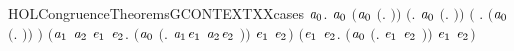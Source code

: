 \begin{SaveVerbatim}{HOLCongruenceTheoremsGCONTEXTXXcases}
\HOLTokenTurnstile{} \HOLSymConst{\HOLTokenForall{}}\ensuremath{\HOLBoundVar{a}\sb{\mathrm{0}}}.
        \ensuremath{\HOLBoundVar{a}\sb{\mathrm{0}}} \HOLSymConst{\HOLTokenEquiv{}}
       \ensuremath{(}\ensuremath{\HOLBoundVar{a}\sb{\mathrm{0}}} \HOLSymConst{\ensuremath{=}} \ensuremath{(}\HOLTokenLambda{}. \ensuremath{)}\ensuremath{)} \HOLSymConst{\HOLTokenDisj{}} \ensuremath{(}\HOLSymConst{\HOLTokenExists{}}. \ensuremath{\HOLBoundVar{a}\sb{\mathrm{0}}} \HOLSymConst{\ensuremath{=}} \ensuremath{(}\HOLTokenLambda{}. \ensuremath{)}\ensuremath{)} \HOLSymConst{\HOLTokenDisj{}}
       \ensuremath{(}\HOLSymConst{\HOLTokenExists{}} . \ensuremath{(}\ensuremath{\HOLBoundVar{a}\sb{\mathrm{0}}} \HOLSymConst{\ensuremath{=}} \ensuremath{(}\HOLTokenLambda{}. \HOLSymConst{\ensuremath{\ldotp}} \ensuremath{)}\ensuremath{)} \HOLSymConst{\HOLTokenConj{}}  \ensuremath{)} \HOLSymConst{\HOLTokenDisj{}}
       \ensuremath{(}\HOLSymConst{\HOLTokenExists{}}\ensuremath{\HOLBoundVar{a}\sb{\mathrm{1}}} \ensuremath{\HOLBoundVar{a}\sb{\mathrm{2}}} \ensuremath{\HOLBoundVar{e}\sb{\mathrm{1}}} \ensuremath{\HOLBoundVar{e}\sb{\mathrm{2}}}.
            \ensuremath{(}\ensuremath{\HOLBoundVar{a}\sb{\mathrm{0}}} \HOLSymConst{\ensuremath{=}} \ensuremath{(}\HOLTokenLambda{}. \ensuremath{\HOLBoundVar{a}\sb{\mathrm{1}}}\HOLSymConst{\ensuremath{\ldotp}}\ensuremath{\HOLBoundVar{e}\sb{\mathrm{1}}}  \HOLSymConst{\ensuremath{+}} \ensuremath{\HOLBoundVar{a}\sb{\mathrm{2}}}\HOLSymConst{\ensuremath{\ldotp}}\ensuremath{\HOLBoundVar{e}\sb{\mathrm{2}}} \ensuremath{)}\ensuremath{)} \HOLSymConst{\HOLTokenConj{}}  \ensuremath{\HOLBoundVar{e}\sb{\mathrm{1}}} \HOLSymConst{\HOLTokenConj{}}
             \ensuremath{\HOLBoundVar{e}\sb{\mathrm{2}}}\ensuremath{)} \HOLSymConst{\HOLTokenDisj{}}
       \ensuremath{(}\HOLSymConst{\HOLTokenExists{}}\ensuremath{\HOLBoundVar{e}\sb{\mathrm{1}}} \ensuremath{\HOLBoundVar{e}\sb{\mathrm{2}}}.
            \ensuremath{(}\ensuremath{\HOLBoundVar{a}\sb{\mathrm{0}}} \HOLSymConst{\ensuremath{=}} \ensuremath{(}\HOLTokenLambda{}. \ensuremath{\HOLBoundVar{e}\sb{\mathrm{1}}}  \HOLSymConst{\ensuremath{\mid}} \ensuremath{\HOLBoundVar{e}\sb{\mathrm{2}}} \ensuremath{)}\ensuremath{)} \HOLSymConst{\HOLTokenConj{}}  \ensuremath{\HOLBoundVar{e}\sb{\mathrm{1}}} \HOLSymConst{\HOLTokenConj{}}  \ensuremath{\HOLBoundVar{e}\sb{\mathrm{2}}}\ensuremath{)} \HOLSymConst{\HOLTokenDisj{}}

\end{SaveVerbatim}
